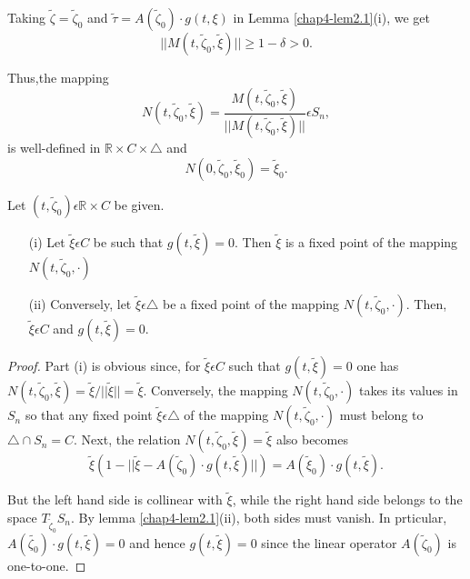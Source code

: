 Taking $\widetilde{\zeta} = \widetilde{\zeta}_{0}$ and
$\widetilde{\tau} = A(\widetilde{\zeta}_{0}) \cdot g(t, \xi)$ in Lemma
\ref{chap4-lem2.1}(i), we get
$$
||M(t, \widetilde{\zeta}_{0}, \widetilde{\xi})|| \geq 1 - \delta > 0.
$$

Thus,\pageoriginale the mapping
\begin{equation*}
N(t, \widetilde{\zeta}_{0}, \widetilde{\xi}) = \frac{M(t,
  \widetilde{\zeta}_{0}, \widetilde{\xi})}{||M(t,
  \widetilde{\zeta}_{0}, \widetilde{\xi})||} \epsilon S_{n},\tag{2.9}\label{chap4-eq2.9}
\end{equation*}
is well-defined in $\mathbb{R} \times C \times \triangle$ and 
\begin{equation*}
N(0, \widetilde{\zeta}_{0}, \widetilde{\xi}_{0}) = \widetilde{\xi}_{0}.\tag{2.10}\label{chap4-eq2.10}
\end{equation*}

\begin{theorem}\label{chap4-thm2.1}
Let $(t, \widetilde{\zeta}_{0}) \epsilon \mathbb{R} \times C$ be given.
\begin{enumerate}
\item[(i)] Let $\widetilde{\xi} \epsilon C$ be such that $g(t,
  \widetilde{\xi}) = 0$. Then $\widetilde{\xi}$ is a fixed point of
  the mapping $N(t, \widetilde{\zeta}_{0}, \cdot)$

\item[(ii)] Conversely, let $\widetilde{\xi} \epsilon \triangle$ be a
  fixed point of the mapping $N(t, \widetilde{\zeta}_{0},
  \cdot)$. Then, $\widetilde{\xi} \epsilon C$ and $g(t,
  \widetilde{\xi}) = 0$.
\end{enumerate}
\end{theorem}

\begin{proof}
Part (i) is obvious since, for $\widetilde{\xi} \epsilon C$ such that
$g(t, \widetilde{\xi}) = 0$ one has $N(t, \widetilde{\zeta}_{0},
\widetilde{\xi}) = \widetilde{\xi} / ||\widetilde{\xi}|| =
\widetilde{\xi}$. Conversely, the mapping $N(t, \widetilde{\zeta}_{0},
\cdot)$ takes its values in $S_{n}$ so that any fixed point
$\widetilde{\xi} \epsilon \triangle$ of the mapping $N(t,
\widetilde{\zeta}_{0}, \cdot)$ must belong to $\triangle \cap S_{n} =
C$. Next, the relation $N(t, \widetilde{\zeta}_{0}, \widetilde{\xi}) =
\widetilde{\xi}$ also becomes
$$
\widetilde{\xi}(1 - ||\widetilde{\xi} - A(\widetilde{\zeta}_{0}) \cdot
g(t, \widetilde{\xi})||) = A(\widetilde{\xi}_{0}) \cdot g(t, \widetilde{\xi}).
$$

But the left hand side is collinear with $\widetilde{\xi}$, while the
right hand side belongs to the space
$T_{\widetilde{\zeta}_{0}}S_{n}$. By lemma \ref{chap4-lem2.1}(ii),
both sides must vanish. In prticular, $A(\widetilde{\zeta_{0}}) \cdot
g(t, \widetilde{\xi}) = 0$ and hence $g(t, \widetilde{\xi}) = 0$ since
the linear operator $A(\widetilde{\zeta}_{0})$ is one-to-one.
\end{proof}


